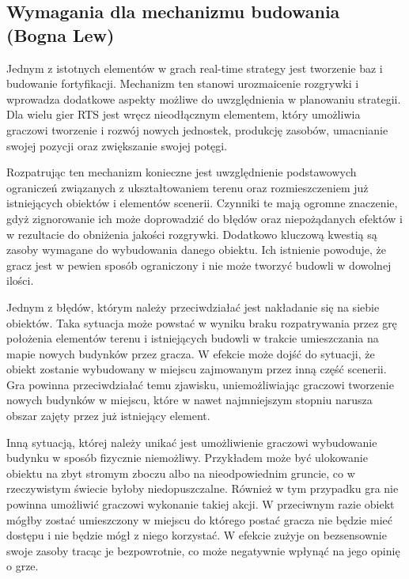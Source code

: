 \subsection{Wymagania dla mechanizmu budowania (Bogna Lew)}
Jednym z istotnych elementów w grach real-time strategy jest tworzenie baz i budowanie fortyfikacji. Mechanizm ten
stanowi urozmaicenie rozgrywki i wprowadza dodatkowe aspekty możliwe do uwzględnienia w planowaniu strategii. Dla wielu
gier RTS jest wręcz nieodłącznym elementem, który umożliwia graczowi tworzenie i rozwój nowych jednostek, produkcję
zasobów, umacnianie swojej pozycji oraz zwiększanie swojej potęgi.

Rozpatrując ten mechanizm konieczne jest uwzględnienie podstawowych ograniczeń związanych z ukształtowaniem terenu oraz
rozmieszczeniem już istniejących obiektów i elementów scenerii. Czynniki te mają ogromne znaczenie, gdyż zignorowanie
ich może doprowadzić do błędów oraz niepożądanych efektów i w rezultacie do obniżenia jakości rozgrywki. Dodatkowo
kluczową kwestią są zasoby wymagane do wybudowania danego obiektu. Ich istnienie powoduje, że gracz jest w pewien sposób
ograniczony i nie może tworzyć budowli w dowolnej ilości.

Jednym z błędów, którym należy przeciwdziałać jest nakładanie się na siebie obiektów. Taka sytuacja może powstać w
wyniku braku rozpatrywania przez grę położenia elementów terenu i istniejących budowli w trakcie umieszczania na mapie
nowych budynków przez gracza. W efekcie może dojść do sytuacji, że obiekt zostanie wybudowany w miejscu zajmowanym przez
inną część scenerii. Gra powinna przeciwdziałać temu zjawisku, uniemożliwiając graczowi tworzenie nowych budynków w
miejscu, które w nawet najmniejszym stopniu narusza obszar zajęty przez już istniejący element.

Inną sytuacją, której należy unikać jest umożliwienie graczowi wybudowanie budynku w sposób fizycznie niemożliwy.
Przykładem może być ulokowanie obiektu na zbyt stromym zboczu albo na nieodpowiednim gruncie, co w rzeczywistym świecie
byłoby niedopuszczalne. Również w tym przypadku gra nie powinna umożliwić graczowi wykonanie takiej akcji. W przeciwnym
razie obiekt mógłby zostać umieszczony w miejscu do którego postać gracza nie będzie mieć dostępu i nie będzie mógł z
niego korzystać. W efekcie zużyje on bezsensownie swoje zasoby tracąc je bezpowrotnie, co może negatywnie wpłynąć na
jego opinię o grze.